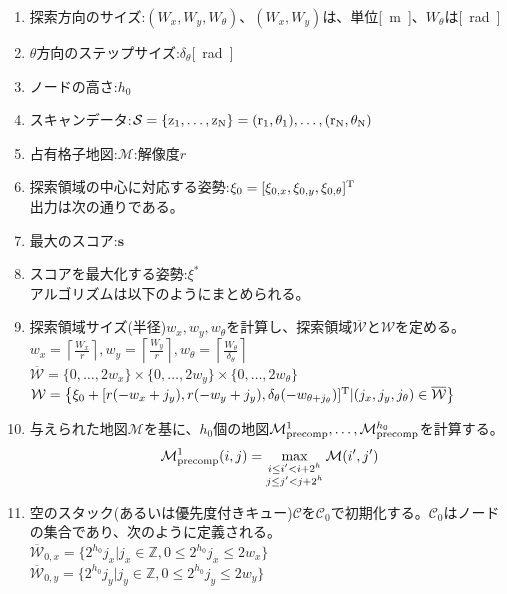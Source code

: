 \begin{enumerate}
  \item 探索方向のサイズ:$(W_x,W_y,W_\theta)$、$(W_x,W_y)$は、単位\si{[m]}、$W_{\theta}$は\si{[rad]}
  \item $\theta$方向のステップサイズ:$\delta_\theta$\si{[rad]}
  \item ノードの高さ:$h_0$
  \item スキャンデータ:$\mathcal{S}=\{\rm{z_1},\ldots,\rm{z_N}\}={(r_1,\theta_1),\ldots, (r_N,\theta_N)}$
  \item 占有格子地図:$\mathcal{M}$:解像度$r$
  \item 探索領域の中心に対応する姿勢:$\xi_0 = [\xi_{0,x},\xi_{0,y},\xi_{0,\theta}]^{\rm{T}}$
  \\出力は次の通りである。
  \item 最大のスコア:$\bm{s}$
  \item スコアを最大化する姿勢:$\xi^{*}$
  \\アルゴリズムは以下のようにまとめられる。
  \item 探索領域サイズ(半径)$w_x,w_y,w_\theta$を計算し、探索領域$\overline{\mathcal{W}}$と$\mathcal{W}$を定める。\\
  $w_x = \left\lceil \frac{W_x}{r}\right\rceil, w_y = \left\lceil \frac{W_y}{r} \right\rceil, w_{\theta} = \left\lceil \frac{W_{\theta}}{\delta_{\theta}}\right\rceil$\\
  $\overline{\mathcal{W}} = \{0,\ldots,2w_x\}\times\{0,\ldots,2w_y\}\times\{0,\ldots,2w_{\theta}\}$\\
  $\mathcal{W} = \bigl\{\xi_0+[r(-w_x+j_y),r(-w_y+j_y),\delta_{\theta}(-w_{\theta+j_{\theta}})]^{\rm{T}}|(j_x,j_y,j_{\theta})\in\overline{\mathcal{W}}\bigr\}$
  \item 与えられた地図$\mathcal{M}$を基に、$h_0$個の地図$\mathcal{M}_{\rm{precomp}}^1,\ldots,\mathcal{M}_{\rm{precomp}}^{h_0}$を計算する。
  \begin{align*}
    \mathcal{M}_{\rm{precomp}}^1(i,j) = \max_{\substack{i\leq i^{\prime} < i+2^h\\j\leq j^{\prime}<j+2^h}} \mathcal{M}(i^{\prime},j^{\prime})  
  \end{align*}
  \item 空のスタック(あるいは優先度付きキュー)$\mathcal{C}$を$\mathcal{C}_0$で初期化する。$\mathcal{C}_0$はノードの集合であり、次のように定義される。\\
  $\overline{\mathcal{W}}_{0,x}=\bigl\{2^{h_0}j_x|j_x\in\mathbb{Z},0\leq 2^{h_0}j_x\leq 2w_x\bigr\}$\\
  $\overline{\mathcal{W}}_{0,y}=\bigl\{2^{h_0}j_y|j_y\in\mathbb{Z},0\leq 2^{h_0}j_y\leq 2w_y\bigr\}$\\

\end{enumerate}
